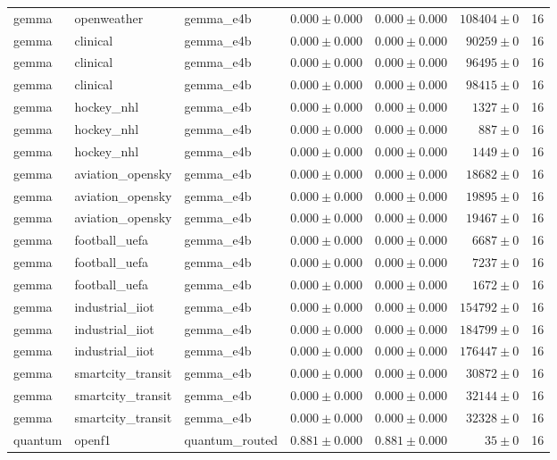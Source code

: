 \begin{table}[htbp]
\begin{tabular}{l l l r r r r}
gemma & openweather & gemma\_e4b & $0.000\pm0.000$ & $0.000\pm0.000$ & $108404\pm0$ & 16 \\
gemma & clinical & gemma\_e4b & $0.000\pm0.000$ & $0.000\pm0.000$ & $90259\pm0$ & 16 \\
gemma & clinical & gemma\_e4b & $0.000\pm0.000$ & $0.000\pm0.000$ & $96495\pm0$ & 16 \\
gemma & clinical & gemma\_e4b & $0.000\pm0.000$ & $0.000\pm0.000$ & $98415\pm0$ & 16 \\
gemma & hockey\_nhl & gemma\_e4b & $0.000\pm0.000$ & $0.000\pm0.000$ & $1327\pm0$ & 16 \\
gemma & hockey\_nhl & gemma\_e4b & $0.000\pm0.000$ & $0.000\pm0.000$ & $887\pm0$ & 16 \\
gemma & hockey\_nhl & gemma\_e4b & $0.000\pm0.000$ & $0.000\pm0.000$ & $1449\pm0$ & 16 \\
gemma & aviation\_opensky & gemma\_e4b & $0.000\pm0.000$ & $0.000\pm0.000$ & $18682\pm0$ & 16 \\
gemma & aviation\_opensky & gemma\_e4b & $0.000\pm0.000$ & $0.000\pm0.000$ & $19895\pm0$ & 16 \\
gemma & aviation\_opensky & gemma\_e4b & $0.000\pm0.000$ & $0.000\pm0.000$ & $19467\pm0$ & 16 \\
gemma & football\_uefa & gemma\_e4b & $0.000\pm0.000$ & $0.000\pm0.000$ & $6687\pm0$ & 16 \\
gemma & football\_uefa & gemma\_e4b & $0.000\pm0.000$ & $0.000\pm0.000$ & $7237\pm0$ & 16 \\
gemma & football\_uefa & gemma\_e4b & $0.000\pm0.000$ & $0.000\pm0.000$ & $1672\pm0$ & 16 \\
gemma & industrial\_iiot & gemma\_e4b & $0.000\pm0.000$ & $0.000\pm0.000$ & $154792\pm0$ & 16 \\
gemma & industrial\_iiot & gemma\_e4b & $0.000\pm0.000$ & $0.000\pm0.000$ & $184799\pm0$ & 16 \\
gemma & industrial\_iiot & gemma\_e4b & $0.000\pm0.000$ & $0.000\pm0.000$ & $176447\pm0$ & 16 \\
gemma & smartcity\_transit & gemma\_e4b & $0.000\pm0.000$ & $0.000\pm0.000$ & $30872\pm0$ & 16 \\
gemma & smartcity\_transit & gemma\_e4b & $0.000\pm0.000$ & $0.000\pm0.000$ & $32144\pm0$ & 16 \\
gemma & smartcity\_transit & gemma\_e4b & $0.000\pm0.000$ & $0.000\pm0.000$ & $32328\pm0$ & 16 \\
quantum & openf1 & quantum\_routed & $0.881\pm0.000$ & $0.881\pm0.000$ & $35\pm0$ & 16 \\

\end{tabular}
\end{table}
